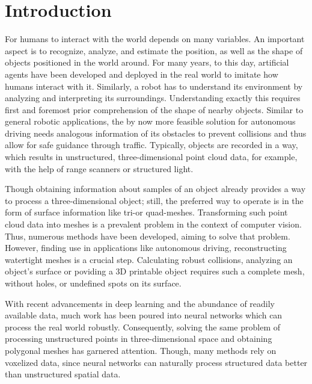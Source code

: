 \chapter{Introduction}
  For humans to interact with the world depends on many variables. 
  An important aspect is to recognize, analyze, and estimate the position,
  as well as the shape of objects positioned in the world around. For many years,
  to this day, artificial agents have been developed and deployed in the real world\cite{1087032,10.1007978-981-13-0224-4_40} 
  to imitate how humans interact with it. Similarly, a robot has to understand its environment
  by analyzing and interpreting its surroundings. Understanding exactly this requires first and 
  foremost prior comprehension of the shape of nearby objects. 
  Similar to general robotic applications, the by now more feasible solution for autonomous driving
  needs analogous information of its obstacles to prevent collisions and thus allow for safe guidance
  through traffic. 
  Typically, objects are recorded in a way, which results in unstructured, three-dimensional point
  cloud data, for example, with the help of range scanners or structured light.

  Though obtaining information about samples of an object already provides a way to process a three-dimensional object;
  still, the preferred way to operate is in the form of surface information like tri-or quad-meshes.
  Transforming such point cloud data into meshes is a prevalent problem in the context of computer vision. Thus, numerous
  methods have been developed, aiming to solve that problem\cite{817351,Jakob2015Instant}.
  However, finding use in applications like autonomous driving, reconstructing watertight meshes is a crucial step. Calculating robust collisions,
  analyzing an object's surface or poviding a 3D printable object requires such a complete mesh, without holes, or undefined spots on its surface.
 
  With recent advancements in deep learning and the abundance of readily available data, much work has been poured
  into neural networks which can process the real world robustly. Consequently, solving the same problem of processing 
  unstructured points in three-dimensional space and obtaining polygonal meshes has garnered attention. Though, many methods 
  rely on voxelized data, since neural networks can naturally process structured data better than unstructured spatial data.

